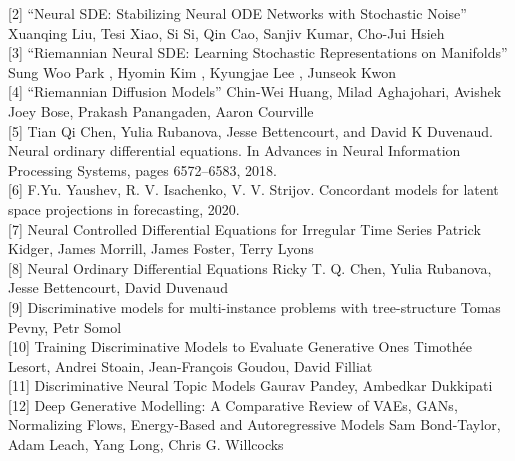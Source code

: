 \documentclass{article}
\begin{document}
[2] “Neural SDE: Stabilizing Neural ODE Networks with Stochastic Noise” Xuanqing Liu, Tesi Xiao, Si Si, Qin Cao, Sanjiv Kumar, Cho-Jui Hsieh  \\

[3] “Riemannian Neural SDE: Learning Stochastic Representations on Manifolds” Sung Woo Park , Hyomin Kim , Kyungjae Lee , Junseok Kwon \\

[4] “Riemannian Diffusion Models” Chin-Wei Huang, Milad Aghajohari, Avishek Joey Bose, Prakash Panangaden, Aaron Courville \\

[5] Tian Qi Chen, Yulia Rubanova, Jesse Bettencourt, and David K Duvenaud. Neural ordinary differential equations. In Advances in Neural Information Processing Systems, pages 6572–6583, 2018. \\

[6] F.Yu. Yaushev, R. V. Isachenko, V. V. Strijov. Concordant models for latent space projections in forecasting, 2020. \\

[7] Neural Controlled Differential Equations for Irregular Time Series
Patrick Kidger, James Morrill, James Foster, Terry Lyons \\

[8] Neural Ordinary Differential Equations
Ricky T. Q. Chen, Yulia Rubanova, Jesse Bettencourt, David Duvenaud \\

[9] Discriminative models for multi-instance problems with tree-structure
Tomas Pevny, Petr Somol \\

[10] Training Discriminative Models to Evaluate Generative Ones
Timothée Lesort, Andrei Stoain, Jean-François Goudou, David Filliat \\

[11] Discriminative Neural Topic Models
Gaurav Pandey, Ambedkar Dukkipati \\

[12] Deep Generative Modelling: A Comparative Review of VAEs, GANs, Normalizing Flows, Energy-Based and Autoregressive Models
Sam Bond-Taylor, Adam Leach, Yang Long, Chris G. Willcocks 
\end{document}
